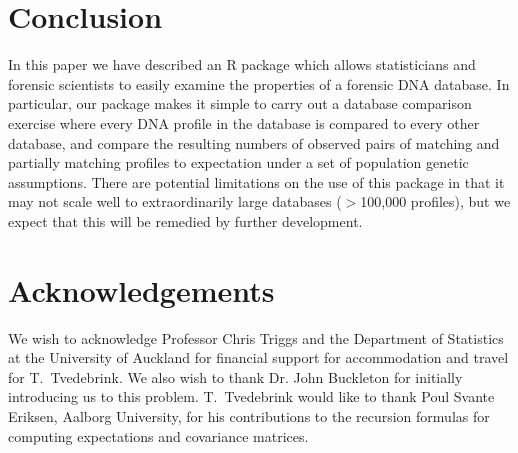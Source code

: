 \documentclass[a4paper,11pt]{article}
\newcommand{\proglang}[1]{\textsf{#1}}
\begin{document}
\section[Conclusion]{Conclusion}
In this paper we have described an \proglang{R} package which allows
statisticians and forensic scientists to easily examine the properties
of a forensic DNA database. In particular, our package makes it simple
to carry out a database comparison exercise where every DNA profile in
the database is compared to every other database, and compare the
resulting numbers of observed pairs of matching and partially matching
profiles to expectation under a set of population genetic
assumptions. There are potential limitations on the use of this
package in that it may not scale well to extraordinarily large
databases ($>$100,000 profiles), but we expect that this will be
remedied by further development.

\section*{Acknowledgements}
We wish to acknowledge Professor Chris Triggs and the Department of
Statistics at the University of Auckland for financial support for
accommodation and travel for T.~Tvedebrink. We also wish to thank
Dr. John Buckleton for initially introducing us to this problem.
T.~Tvedebrink would like to thank Poul Svante Eriksen, Aalborg
University, for his contributions to the recursion formulas for
computing expectations and covariance matrices. 


\end{document}
